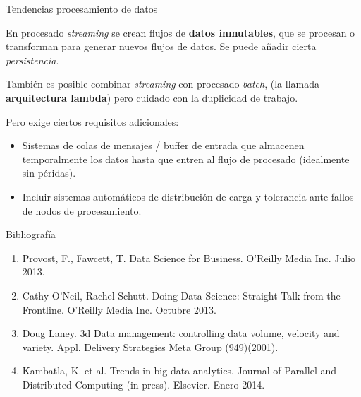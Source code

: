 
\begin{frame}{Tendencias procesamiento de datos}
 
 \begin{wideitemize}
  
  \item En procesado \textit{streaming} se crean flujos de \textbf{datos inmutables}, que
  se procesan o transforman para generar nuevos flujos de datos. Se puede añadir 
  cierta \textit{persistencia}.
  
  \item También es posible combinar \textit{streaming} con procesado \textit{batch},
  (la llamada \textbf{arquitectura lambda}) pero cuidado con la duplicidad de trabajo.
  
  \item Pero exige ciertos requisitos adicionales:
  
  \begin{itemize}
   \item Sistemas de colas de mensajes / buffer de entrada que almacenen temporalmente
   los datos hasta que entren al flujo de procesado (idealmente sin péridas).
   
   \item Incluir sistemas automáticos de distribución de carga y tolerancia ante
   fallos de nodos de procesamiento.
   
  \end{itemize}

  
 \end{wideitemize}

 
\end{frame}



\begin{frame}{Bibliografía}
\begin{enumerate}
 \item Provost, F., Fawcett, T. Data Science for Business. O'Reilly Media Inc. Julio 2013.
 \item Cathy O'Neil, Rachel Schutt. Doing Data Science: Straight Talk from the Frontline.
 O'Reilly Media Inc. Octubre 2013.
 \item Doug Laney. 3d Data management: controlling data volume, velocity and variety.
 Appl. Delivery Strategies Meta Group (949)(2001).
 \item Kambatla, K. et al. Trends in big data analytics. Journal of Parallel and Distributed
 Computing (in press). Elsevier. Enero 2014.
\end{enumerate}
\end{frame}


